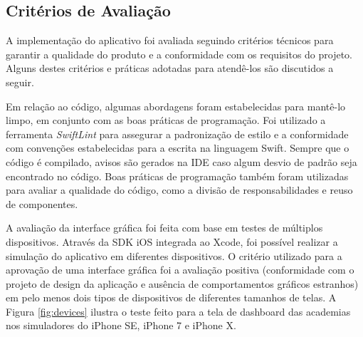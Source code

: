 \subsection{Critérios de Avaliação}
A implementação do aplicativo foi avaliada seguindo critérios técnicos para garantir a qualidade do produto e a conformidade com os requisitos do projeto. Alguns destes critérios e práticas adotadas para atendê-los são discutidos a seguir.

Em relação ao código, algumas abordagens foram estabelecidas para mantê-lo limpo, em conjunto com as boas práticas de programação. Foi utilizado a ferramenta \textit{SwiftLint}  para assegurar a padronização de estilo e a conformidade com convenções estabelecidas para a escrita na linguagem Swift. Sempre que o código é compilado, avisos são gerados na IDE caso algum desvio de padrão seja encontrado no código. Boas práticas de programação também foram utilizadas para avaliar a qualidade do código, como a divisão de responsabilidades e reuso de componentes.

A avaliação da interface gráfica foi feita com base em testes de múltiplos dispositivos. Através da SDK iOS integrada ao Xcode, foi possível realizar a simulação do aplicativo em diferentes dispositivos. O critério utilizado para a aprovação de uma interface gráfica foi a avaliação positiva (conformidade com o projeto de design da aplicação e ausência de comportamentos gráficos estranhos) em pelo menos dois tipos de dispositivos de diferentes tamanhos de telas. A Figura \ref{fig:devices} ilustra o teste feito para a tela de dashboard das academias nos simuladores do iPhone SE, iPhone 7 e iPhone X.

